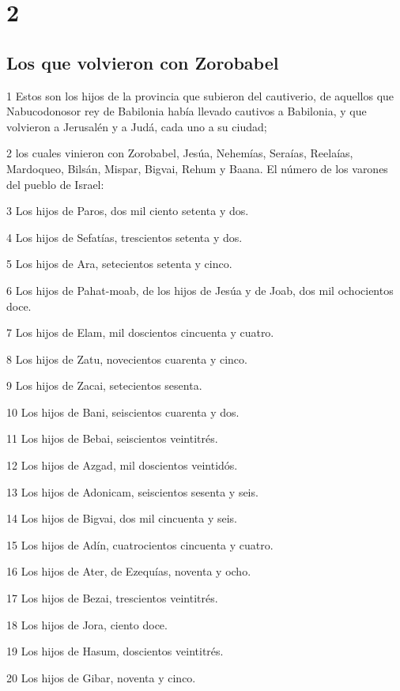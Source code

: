 \chapter{2}

\section*{Los que volvieron con Zorobabel }

\par 1 Estos son los hijos de la provincia que subieron del cautiverio, de aquellos que Nabucodonosor rey de Babilonia había llevado cautivos a Babilonia, y que volvieron a Jerusalén y a Judá, cada uno a su ciudad;
\par 2 los cuales vinieron con Zorobabel, Jesúa, Nehemías, Seraías, Reelaías, Mardoqueo, Bilsán, Mispar, Bigvai, Rehum y Baana. El número de los varones del pueblo de Israel:
\par 3 Los hijos de Paros, dos mil ciento setenta y dos.
\par 4 Los hijos de Sefatías, trescientos setenta y dos.
\par 5 Los hijos de Ara, setecientos setenta y cinco.
\par 6 Los hijos de Pahat-moab, de los hijos de Jesúa y de Joab, dos mil ochocientos doce.
\par 7 Los hijos de Elam, mil doscientos cincuenta y cuatro.
\par 8 Los hijos de Zatu, novecientos cuarenta y cinco.
\par 9 Los hijos de Zacai, setecientos sesenta.
\par 10 Los hijos de Bani, seiscientos cuarenta y dos.
\par 11 Los hijos de Bebai, seiscientos veintitrés.
\par 12 Los hijos de Azgad, mil doscientos veintidós.
\par 13 Los hijos de Adonicam, seiscientos sesenta y seis.
\par 14 Los hijos de Bigvai, dos mil cincuenta y seis.
\par 15 Los hijos de Adín, cuatrocientos cincuenta y cuatro.
\par 16 Los hijos de Ater, de Ezequías, noventa y ocho.
\par 17 Los hijos de Bezai, trescientos veintitrés.
\par 18 Los hijos de Jora, ciento doce.
\par 19 Los hijos de Hasum, doscientos veintitrés.
\par 20 Los hijos de Gibar, noventa y cinco.
